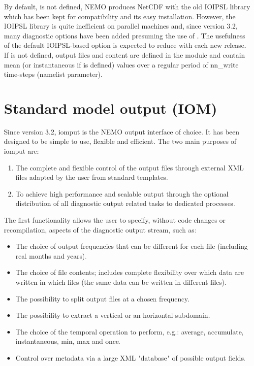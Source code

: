 \documentclass[../tex_main/NEMO_manual]{subfiles}
\begin{document}
By default,  is not defined, NEMO produces NetCDF with the old IOIPSL library which 
has been kept for compatibility and its easy installation.
However, the IOIPSL library is quite inefficient on parallel machines and, since version 3.2, 
many diagnostic options have been added presuming the use of . 
The usefulness of the default IOIPSL-based option is expected to reduce with each new release. 
If  is not defined, output files and content are defined in the  module and 
contain mean (or instantaneous if  is defined) values over a regular period of 
nn\_write time-steps (namelist parameter). 


\section{Standard model output (IOM)}
\label{sec:DIA_iom}

Since version 3.2, iomput is the NEMO output interface of choice. 
It has been designed to be simple to use, flexible and efficient. 
The two main purposes of iomput are: 

\begin{enumerate}
	\item The complete and flexible control of the output files through external XML files adapted by 
			the user from standard templates.
	\item To achieve high performance and scalable output through the optional distribution of 
			all diagnostic output related tasks to dedicated processes.
\end{enumerate}

The first functionality allows the user to specify, without code changes or recompilation, 
aspects of the diagnostic output stream, such as:

\begin{itemize}
	\item The choice of output frequencies that can be different for each file 
			(including real months and years).
	\item The choice of file contents; includes complete flexibility over which data are written in 
			which files (the same data can be written in different files).
	\item The possibility to split output files at a chosen frequency.
	\item The possibility to extract a vertical or an horizontal subdomain.
	\item The choice of the temporal operation to perform, 
			e.g.: average, accumulate, instantaneous, min, max and once.
	\item Control over metadata via a large XML "database" of possible output fields.
\end{itemize}
\end{document}
